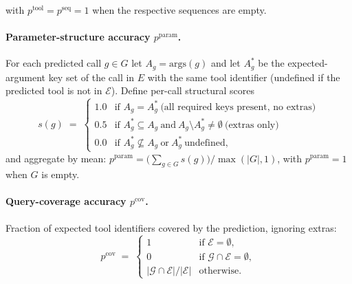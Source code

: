 \noindent with $p^{\text{tool}} = p^{\text{seq}} = 1$ when the respective sequences are empty.

\vspace{-0.15cm}
\paragraph{Parameter-structure accuracy $p^{\text{param}}$.}
For each predicted call $g \in G$ let $A_g = \mathrm{args}(g)$ and let $A^{*}_{g}$ be the expected-argument key set of the call in $E$ with the same tool identifier (undefined if the predicted tool is not in $\mathcal{E}$). Define per-call structural scores
\begin{equation}
s(g) \;=\;
\begin{cases}
  1.0 & \text{if } A_g = A^{*}_{g} \ \text{(all required keys present, no extras)} \\
  0.5 & \text{if } A^{*}_{g} \subseteq A_g \ \text{and} \ A_g \setminus A^{*}_{g} \neq \emptyset \ \text{(extras only)} \\
  0.0 & \text{if } A^{*}_{g} \not\subseteq A_g \ \text{or} \ A^{*}_{g} \ \text{undefined},
\end{cases}
\label{eq:prog-param-per-call}
\end{equation}
and aggregate by mean: $p^{\text{param}} = \bigl(\sum_{g \in G} s(g)\bigr) / \max(|G|, 1)$, with $p^{\text{param}} = 1$ when $G$ is empty.

\vspace{-0.25cm}
\paragraph{Query-coverage accuracy $p^{\text{cov}}$.}
Fraction of expected tool identifiers covered by the prediction, ignoring extras:
\begin{equation}
p^{\text{cov}} \;=\;
\begin{cases}
  1                                        & \text{if } \mathcal{E} = \emptyset, \\
  0                                        & \text{if } \mathcal{G} \cap \mathcal{E} = \emptyset, \\
  \lvert \mathcal{G} \cap \mathcal{E} \rvert / \lvert \mathcal{E} \rvert & \text{otherwise}.
\end{cases}
\label{eq:prog-cov}
\end{equation}

\vspace{-0.25cm}
